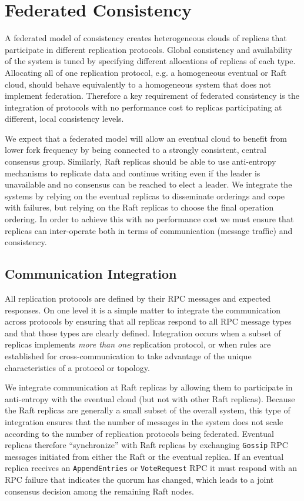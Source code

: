 \documentclass[10pt,conference,letterpaper]{IEEEtran}
\begin{document}
\section{Federated Consistency}
\label{sec:federated}

A federated model of consistency creates heterogeneous clouds of replicas that participate
in different replication protocols.
Global consistency and availability of the system is tuned by specifying different
allocations of replicas of each type.
Allocating all of one replication protocol, e.g. a homogeneous eventual or Raft cloud,
should behave equivalently to a homogeneous system that does not implement federation.
Therefore a key requirement of federated consistency is the integration of protocols with
no performance cost to replicas participating at different, local consistency levels.

We expect that a federated model will allow an eventual cloud to benefit from lower fork
frequency by being connected to a strongly consistent, central consensus group.
Similarly, Raft replicas should be able to use anti-entropy mechanisms to replicate data
and continue writing even if the leader is unavailable and no consensus can be reached to
elect a leader.
We integrate the systems by relying on the eventual replicas to disseminate orderings and
cope with failures, but relying on the Raft replicas to choose the final operation
ordering.
In order to achieve this with no performance cost we must ensure that replicas can
inter-operate both in terms of communication (message traffic) and consistency.

\subsection{Communication Integration}

All replication protocols are defined by their RPC messages and expected responses.
On one level it is a simple matter to integrate the communication across protocols by
ensuring that all replicas respond to all RPC message types and that those types are
clearly defined.
Integration occurs when a subset of replicas implements \textit{more than one}
replication protocol, or when rules are established for cross-communication to take
advantage of the unique characteristics of a protocol or topology.

We integrate communication at Raft replicas by allowing them to participate in
anti-entropy with the eventual cloud (but not with other Raft replicas).
Because the Raft replicas are generally a small subset of the overall system, this type
of integration ensures that the number of messages in the system does not scale according
to the number of replication protocols being federated.
Eventual replicas therefore ``synchronize'' with Raft replicas by exchanging
\texttt{Gossip} RPC messages initiated from either the Raft or the eventual
replica.
If an eventual replica receives an \texttt{AppendEntries} or \texttt{VoteRequest} RPC it
must respond with an RPC failure that indicates the quorum has changed, which leads to a
joint consensus decision among the remaining Raft nodes.
\end{document}
